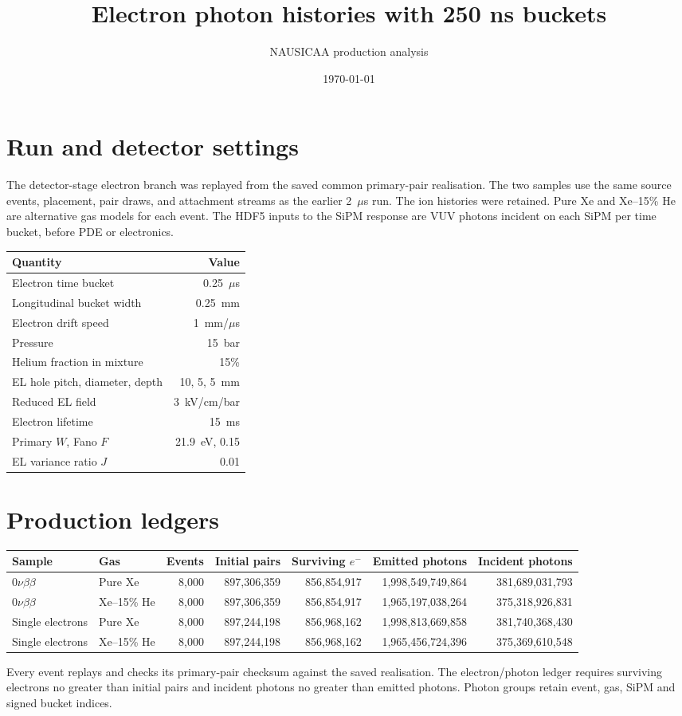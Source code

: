 \documentclass[10pt,a4paper]{article}
\title{Electron photon histories with 250 ns buckets}
\author{NAUSICAA production analysis}
\date{\today}
\begin{document}
\maketitle
\section*{Run and detector settings}
The detector-stage electron branch was replayed from the saved common
primary-pair realisation. The two samples use the same source events,
placement, pair draws, and attachment streams as the earlier 2~$\mu$s run.
The ion histories were retained. Pure Xe and Xe--15\% He are alternative gas
models for each event. The HDF5 inputs to the SiPM response are VUV photons
incident on each SiPM per time bucket, before PDE or electronics.

\begin{center}\begin{tabular}{lr}\toprule
Quantity & Value\\\midrule
Electron time bucket & 0.25~$\mu$s\\
Longitudinal bucket width & 0.25~mm\\
Electron drift speed & 1~mm/$\mu$s\\
Pressure & 15~bar\\
Helium fraction in mixture & 15\%\\
EL hole pitch, diameter, depth & 10, 5, 5~mm\\
Reduced EL field & 3~kV/cm/bar\\
Electron lifetime & 15~ms\\
Primary $W$, Fano $F$ & 21.9~eV, 0.15\\
EL variance ratio $J$ & 0.01\\
\bottomrule\end{tabular}\end{center}

\section*{Production ledgers}
\small
\begin{longtable}{llrrrrr}\toprule
Sample & Gas & Events & Initial pairs & Surviving $e^-$ & Emitted photons & Incident photons\\\midrule
$0\nu\beta\beta$ & Pure Xe & 8,000 & 897,306,359 & 856,854,917 & 1,998,549,749,864 & 381,689,031,793 \\
$0\nu\beta\beta$ & Xe--15\% He & 8,000 & 897,306,359 & 856,854,917 & 1,965,197,038,264 & 375,318,926,831 \\
Single electrons & Pure Xe & 8,000 & 897,244,198 & 856,968,162 & 1,998,813,669,858 & 381,740,368,430 \\
Single electrons & Xe--15\% He & 8,000 & 897,244,198 & 856,968,162 & 1,965,456,724,396 & 375,369,610,548 \\
\bottomrule\end{longtable}
\normalsize
Every event replays and checks its primary-pair checksum against the saved
realisation. The electron/photon ledger requires surviving electrons no
greater than initial pairs and incident photons no greater than emitted
photons. Photon groups retain event, gas, SiPM and signed bucket indices.
\end{document}
